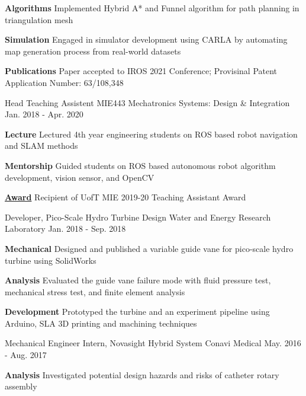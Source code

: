 \begin{cventries}
{\begin{cvitems}
{				\textbf{Algorithms} Implemented Hybrid A* and Funnel algorithm for path planning in triangulation mesh
			}
			\item {
				\textbf{Simulation} Engaged in simulator development using CARLA by automating map generation process from real-world datasets
			}
			\item{
				\textbf{Publications} Paper accepted to IROS 2021 Conference; Provisinal Patent Application Number: 63/108,348
			}
		\end{cvitems}
	}
	\cventry
	{Head Teaching Assistent}
	{MIE443 Mechatronics Systems: Design \& Integration}
	{Jan. 2018 - Apr. 2020}
	{}
	{
		\begin{cvitems}
			\item {
				\textbf{Lecture} Lectured 4th year engineering students on ROS based robot navigation and SLAM methods
			}
			\item {
				\textbf{Mentorship} Guided students on ROS based autonomous robot algorithm development, vision sensor, and OpenCV
			}
			\item \textbf{\href{https://www.mie.utoronto.ca/congratulations-2019-20-teaching-assistant-award-winners-lap-tak-chu-richard-hu-behzad-khamidehi-ben-leung-and-khalil-sidawi/}{Award}} Recipient of UofT MIE 2019-20 Teaching Assistant Award
		\end{cvitems}
	}
	\cventry
	{Developer, Pico-Scale Hydro Turbine Design}
	{Water and Energy Research Laboratory}
	{Jan. 2018 - Sep. 2018}
	{}
	{
		\begin{cvitems}
			\item {\textbf{Mechanical} Designed and published a variable guide vane for pico-scale hydro turbine using SolidWorks}
			\item {\textbf{Analysis} Evaluated the guide vane failure mode with fluid pressure test, mechanical stress test, and finite element analysis}
			\item {\textbf{Development} Prototyped the turbine and an experiment pipeline using Arduino, SLA 3D printing and machining techniques}
		\end{cvitems}
	}
	\cventry
	{Mechanical Engineer Intern, Novasight Hybrid System}
	{Conavi Medical} 
	{May. 2016 - Aug. 2017}
	{}
	{
		\begin{cvitems}
			\item {
				\textbf{Analysis} Investigated potential design hazards and risks of catheter rotary assembly
			}
			\item {
}
\end{cvitems}}
\end{cventries}
